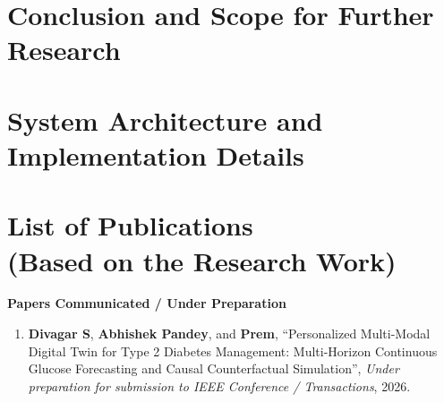 \documentclass[a4paper, 12pt]{report}
\theoremstyle{definition}
\begin{document}
	\chapter{Conclusion and Scope for Further Research}
	

	\appendix
	\chapter{System Architecture and Implementation Details}
	

	\newpage
	\renewcommand{\bibname}{References}
	
	

	\chapter*{List of Publications \\ \large(Based on the Research Work)}
	
	\textbf{\Large Papers Communicated / Under Preparation}
	\begin{enumerate}
		\item \textbf{Divagar S}, \textbf{Abhishek Pandey}, and \textbf{Prem}, \enquote{Personalized Multi-Modal Digital Twin for Type 2 Diabetes Management: Multi-Horizon Continuous Glucose Forecasting and Causal Counterfactual Simulation}, \emph{Under preparation for submission to IEEE Conference / Transactions}, 2026.
	\end{enumerate}
\end{document}

